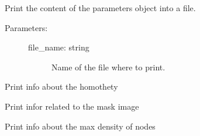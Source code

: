 \documentclass[letterpaper,10pt,english]{sphinxmanual}
\begin{document}
\begin{fulllineitems}
\begin{fulllineitems}
\end{fulllineitems}


\begin{fulllineitems}
\label{\detokenize{appendices:s2Dcd.deesse.Param.print_file}}
Print the content of the parameters object into a file.
\begin{description}
\item[{Parameters:}] \leavevmode\begin{description}
\item[{file\_name: string}] \leavevmode
Name of the file where to print.

\end{description}

\end{description}

\end{fulllineitems}


\begin{fulllineitems}
\label{\detokenize{appendices:s2Dcd.deesse.Param.print_homo}}
Print info about the homothety

\end{fulllineitems}


\begin{fulllineitems}
\label{\detokenize{appendices:s2Dcd.deesse.Param.print_maskimage}}
Print infor related to the mask image

\end{fulllineitems}


\begin{fulllineitems}
\label{\detokenize{appendices:s2Dcd.deesse.Param.print_max_dens}}
Print info about the max density of nodes


\end{fulllineitems}
\end{fulllineitems}
\end{document}
